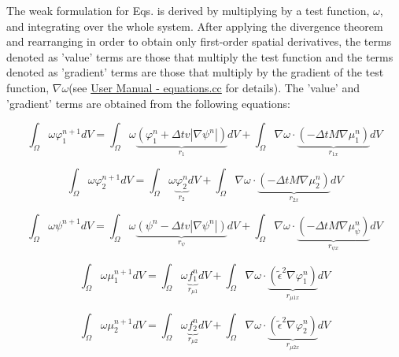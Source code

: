 \documentclass[11pt]{article}
\begin{document}
The weak formulation for Eqs.  is derived by multiplying by a test function, $\omega$, and integrating over the whole system. After applying the divergence theorem and rearranging in order to obtain only first-order spatial derivatives, the terms denoted as 'value' terms are those that multiply the test function and the terms denoted as 'gradient' terms are those that multiply by the gradient of the test function, $\nabla \omega$(see \href{https://prisms-center.github.io/phaseField/doxygen_files/app_files.html}{User Manual - equations.cc} for details). The 'value' and 'gradient' terms are obtained from the following equations:

\begin{equation} \label{phi1_weak}
\int_\Omega \omega \varphi^{n+1}_1dV = \int_\Omega \omega\underbrace{\left(\varphi^{n}_1+\Delta tv|\nabla\psi^n|\right)}_{r_1}dV + \int_\Omega \nabla\omega\cdot\underbrace{\left(-\Delta t M\nabla\mu^{n}_1\right)}_{r_{1 x}}dV
\end{equation}

\begin{equation} \label{phi2_weak}
\int_\Omega \omega \varphi^{n+1}_2dV = \int_\Omega \omega\underbrace{\varphi^n_2}_{r_2}dV + \int_\Omega \nabla\omega\cdot\underbrace{\left(-\Delta t M\nabla\mu^{n}_2\right)}_{r_{2x}}dV
\end{equation}

\begin{equation} \label{psi_weak}
\int_\Omega \omega \psi^{n+1}dV = \int_\Omega \omega\underbrace{\left(\psi^n-\Delta tv|\nabla\psi^n|\right)}_{r_{\psi}}dV + \int_\Omega \nabla\omega\cdot\underbrace{\left(-\Delta t M\nabla\mu^n_{\psi}\right)}_{r_{\psi x}}dV
\end{equation}

\begin{equation} \label{mu1_weak}
\int_\Omega \omega\mu^{n+1}_1dV = \int_\Omega \omega \underbrace{f^n_1}_{r_{\mu 1}} dV +\int_\Omega \nabla\omega\cdot\underbrace{\left(\widetilde{\epsilon}^2\nabla\varphi^n_1\right)}_{r_{\mu 1 x}}dV
\end{equation}

\begin{equation} \label{mu2_weak}
\int_\Omega \omega\mu^{n+1}_2dV = \int_\Omega \omega \underbrace{f^n_2}_{r_{\mu 2}} dV +\int_\Omega \nabla\omega\cdot\underbrace{\left(\widetilde{\epsilon}^2\nabla\varphi^n_2\right)}_{r_{\mu 2 x}}dV
\end{equation}
\end{document}
